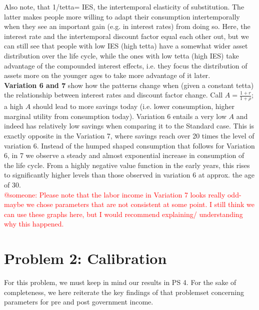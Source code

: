 \documentclass[12pt,a4paper]{article}
\begin{document}
Also note, that 1/tetta= IES, the intertemporal elasticity of substitution. The latter makes people more willing to adapt their consumption intertemporally when they see an important gain (e.g. in interest rates) from doing so. Here, the interest rate and the intertemporal discount factor equal each other out, but we can still see that people with low IES (high tetta) have a somewhat wider asset distribution over the life cycle, while the ones with low tetta (high IES) take advantage of the compounded interest effects, i.e. they focus the distribution of assets more on the younger ages to take more advantage of it later.\\

\textbf{Variation 6 and 7} show how the patterns change when (given a constant tetta) the relationship between interest rates and discount factor change. Call $A = \frac{1+r}{1+\rho}$; a high $A$ should lead to more savings today (i.e. lower consumption, higher marginal utility from consumption today). Variation 6 entails a very low $A$ and indeed has relatively low savings when comparing it to the Standard case. This is exactly opposite in the Variation 7, where savings reach over 20 times the level of variation 6. Instead of the humped shaped consumption that follows for Variation 6, in 7 we observe a steady and almost exponential increase in consumption of the life cycle. From a highly negative value function in the early years, this rises to significantly higher levels than those observed in variation 6 at approx. the age of 30.\\

\textcolor{red}{@someone: Please note that the labor income in Variation 7 looks really odd- maybe we chose parameters that are not consistent at some point. I still think we can use these graphs here, but I would recommend explaining/ understanding why this happened. }

\section*{Problem 2: Calibration}

For this problem, we must keep in mind our results in PS 4. For the sake of completeness, we here reiterate the key findings of that problemset concerning parameters for pre and post government income.
\end{document}
